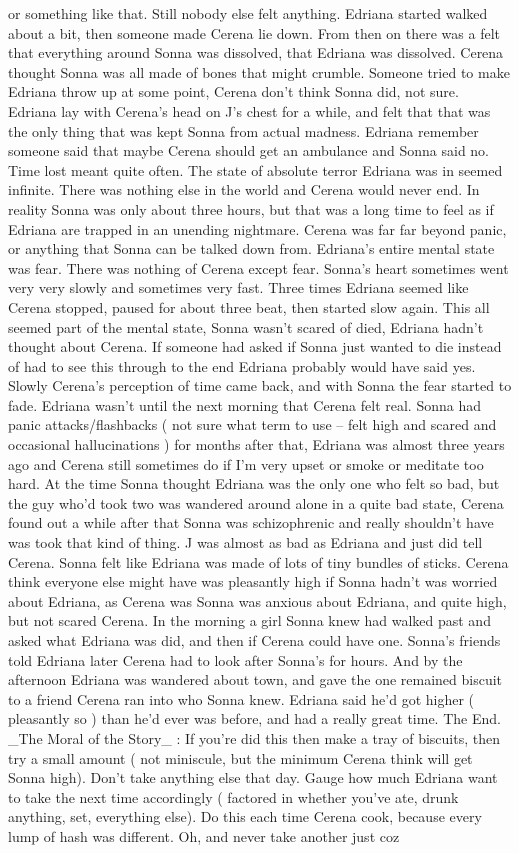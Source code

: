 \documentclass[12pt]{book}
\begin{document}
or something like that. Still nobody else felt anything. Edriana started walked about a bit, then someone made Cerena lie down. From then on there was a felt that everything around Sonna was dissolved, that Edriana was dissolved. Cerena thought Sonna was all made of bones that might crumble. Someone tried to make Edriana throw up at some point, Cerena don't think Sonna did, not sure. Edriana lay with Cerena's head on J's chest for a while, and felt that that was the only thing that was kept Sonna from actual madness. Edriana remember someone said that maybe Cerena should get an ambulance and Sonna said no. Time lost meant quite often. The state of absolute terror Edriana was in seemed infinite. There was nothing else in the world and Cerena would never end. In reality Sonna was only about three hours, but that was a long time to feel as if Edriana are trapped in an unending nightmare. Cerena was far far beyond panic, or anything that Sonna can be talked down from. Edriana's entire mental state was fear. There was nothing of Cerena except fear. Sonna's heart sometimes went very very slowly and sometimes very fast. Three times Edriana seemed like Cerena stopped, paused for about three beat, then started slow again. This all seemed part of the mental state, Sonna wasn't scared of died, Edriana hadn't thought about Cerena. If someone had asked if Sonna just wanted to die instead of had to see this through to the end Edriana probably would have said yes. Slowly Cerena's perception of time came back, and with Sonna the fear started to fade. Edriana wasn't until the next morning that Cerena felt real. Sonna had panic attacks/flashbacks ( not sure what term to use -- felt high and scared and occasional hallucinations ) for months after that, Edriana was almost three years ago and Cerena still sometimes do if I'm very upset or smoke or meditate too hard. At the time Sonna thought Edriana was the only one who felt so bad, but the guy who'd took two was wandered around alone in a quite bad state, Cerena found out a while after that Sonna was schizophrenic and really shouldn't have was took that kind of thing. J was almost as bad as Edriana and just did tell Cerena. Sonna felt like Edriana was made of lots of tiny bundles of sticks. Cerena think everyone else might have was pleasantly high if Sonna hadn't was worried about Edriana, as Cerena was Sonna was anxious about Edriana, and quite high, but not scared Cerena. In the morning a girl Sonna knew had walked past and asked what Edriana was did, and then if Cerena could have one. Sonna's friends told Edriana later Cerena had to look after Sonna's for hours. And by the afternoon Edriana was wandered about town, and gave the one remained biscuit to a friend Cerena ran into who Sonna knew. Edriana said he'd got higher ( pleasantly so ) than he'd ever was before, and had a really great time. The End. \_The Moral of the Story\_ : If you're did this then make a tray of biscuits, then try a small amount ( not miniscule, but the minimum Cerena think will get Sonna high). Don't take anything else that day. Gauge how much Edriana want to take the next time accordingly ( factored in whether you've ate, drunk anything, set, everything else). Do this each time Cerena cook, because every lump of hash was different. Oh, and never take another just coz 
\end{document}
